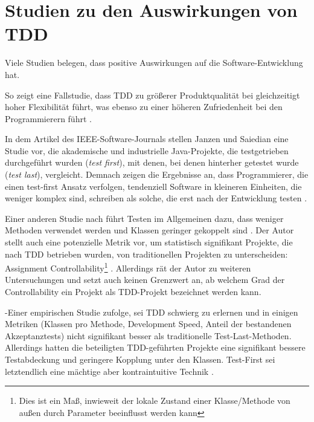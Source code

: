 \section{Studien zu den Auswirkungen von TDD}

Viele Studien belegen, dass  positive Auswirkungen auf die Software-Entwicklung hat.


So zeigt eine Fallstudie, dass TDD zu größerer Produktqualität bei gleichzeitigt hoher Flexibilität führt, was ebenso zu einer höheren Zufriedenheit bei den Programmierern führt \citep{hans_wasmus_evaluation_2007}.




In dem Artikel des IEEE-Software-Journals stellen Janzen und Saiedian eine Studie vor, die akademische und industrielle Java-Projekte, die testgetrieben durchgeführt wurden (\textit{test first}), mit denen, bei denen hinterher getestet wurde (\textit{test last}), vergleicht. Demnach zeigen die Ergebnisse an, dass Programmierer, die einen test-first Ansatz verfolgen, tendenziell Software in kleineren Einheiten, die weniger komplex sind, schreiben als solche, die erst nach der Entwicklung testen \citep{janzen_does_2008}.


Einer anderen Studie nach führt Testen im Allgemeinen dazu, dass weniger Methoden verwendet werden und Klassen geringer gekoppelt sind \cite{mueller_effect_2006}. Der Autor stellt auch eine potenzielle Metrik vor, um statistisch signifikant Projekte, die nach TDD betrieben wurden, von traditionellen Projekten zu unterscheiden: Assignment Controllability\footnote{Dies ist ein Maß, inwieweit der lokale Zustand einer Klasse/Methode von außen durch Parameter beeinflusst werden kann} \cite{mueller_effect_2006}. Allerdings rät der Autor zu weiteren Untersuchungen und setzt auch keinen Grenzwert an, ab welchem Grad der Controllability ein Projekt als TDD-Projekt bezeichnet werden kann.

-Einer empirischen Studie zufolge, sei TDD schwierg zu erlernen und in einigen Metriken (Klassen pro Methode, Development Speed, Anteil der bestandenen Akzeptanztests) nicht signifikant besser als traditionelle Test-Last-Methoden. Allerdings hatten die beteiligten TDD-geführten Projekte eine signifikant bessere Testabdeckung und geringere Kopplung unter den Klassen. Test-First sei letztendlich eine mächtige aber kontraintuitive Technik \citep{madeyski_test-driven_2009}.

